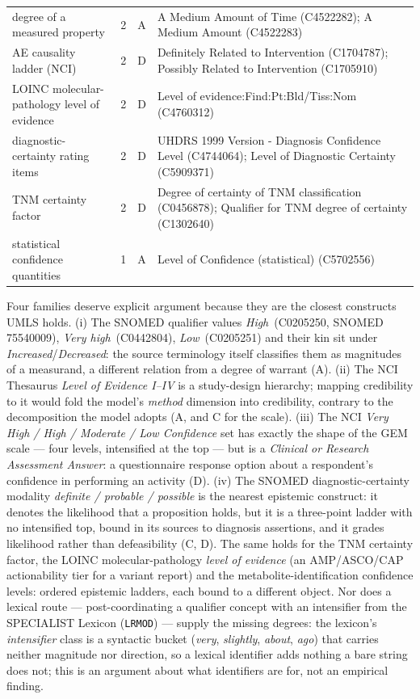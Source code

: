 \begin{table}[H]
\begin{tabularx}{\linewidth}{@{}>{\raggedright\arraybackslash}X r c >{\raggedright\arraybackslash}X@{}}
    degree of a measured property & 2 & A & A Medium Amount of Time (C4522282); A Medium Amount (C4522283) \\
    AE causality ladder (NCI) & 2 & D & Definitely Related to Intervention (C1704787); Possibly Related to Intervention (C1705910) \\
    LOINC molecular-pathology level of evidence & 2 & D & Level of evidence:Find:Pt:Bld/Tiss:Nom (C4760312) \\
    diagnostic-certainty rating items & 2 & D & UHDRS 1999 Version - Diagnosis Confidence Level (C4744064); Level of Diagnostic Certainty (C5909371) \\
    TNM certainty factor & 2 & D & Degree of certainty of TNM classification (C0456878); Qualifier for TNM degree of certainty (C1302640) \\
    statistical confidence quantities & 1 & A & Level of Confidence (statistical) (C5702556) \\
    \bottomrule
  \end{tabularx}
\end{table}

Four families deserve explicit argument because they are the closest
constructs UMLS holds. (i) The SNOMED qualifier values
\emph{High}~(C0205250, SNOMED 75540009), \emph{Very high}~(C0442804),
\emph{Low}~(C0205251) and their kin sit under
\emph{Increased}/\emph{Decreased}: the source terminology itself classifies
them as magnitudes of a measurand, a different relation from a degree of
warrant (A). (ii) The
NCI Thesaurus \emph{Level of Evidence I--IV} is a study-design hierarchy;
mapping credibility to it would fold the model's \emph{method} dimension into
credibility, contrary to the decomposition the model adopts (A, and C for the
scale). (iii) The NCI \emph{Very High / High / Moderate / Low Confidence}
set has exactly the shape of the GEM scale --- four levels, intensified at
the top --- but is a \emph{Clinical or Research Assessment Answer}: a
questionnaire response option about a respondent's confidence in performing
an activity (D). (iv) The SNOMED diagnostic-certainty modality
\emph{definite / probable / possible} is the nearest epistemic construct: it
denotes the likelihood that a proposition holds, but it is a three-point
ladder with no intensified top, bound in its sources to diagnosis
assertions, and it grades likelihood rather than defeasibility (C, D). The
same holds for the TNM certainty factor, the LOINC molecular-pathology
\emph{level of evidence} (an AMP/ASCO/CAP actionability tier for a variant
report) and the metabolite-identification confidence levels: ordered
epistemic ladders, each bound to a different object. Nor does a lexical
route --- post-coordinating a qualifier concept with an intensifier from the
SPECIALIST Lexicon (\texttt{LRMOD}) --- supply the missing degrees: the
lexicon's \emph{intensifier} class is a syntactic bucket (\emph{very},
\emph{slightly}, \emph{about}, \emph{ago}) that carries neither magnitude nor
direction, so a lexical identifier adds nothing a bare string does not; this
is an argument about what identifiers are for, not an empirical finding.

